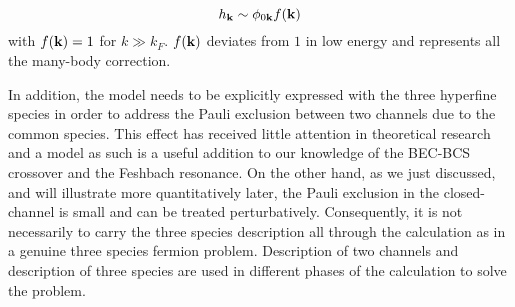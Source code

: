 \begin{equation}\label{eq:pathInt2:hphif}
h_{\mathbf{k}}\sim\phi_{0\mathbf{k}}f(\mathbf{k})
\end{equation}
 with $f(\mathbf{k})=1$ for $k\gg{k_{F}}$.  $f(\mathbf{k})$ deviates from $1$ in low energy and represents all the many-body correction. 

%
% 
%
In addition, the model needs to be explicitly expressed with the three hyperfine species in order to address the Pauli exclusion between two channels due to the common species.  This effect has received little  attention in theoretical research and a model as such is a useful addition to our knowledge of the BEC-BCS crossover and the Feshbach resonance.  On the other hand, as we just discussed, and will illustrate more quantitatively later, the Pauli exclusion in the closed-channel is small and can be treated perturbatively.  Consequently, it is not necessarily to carry the three species description all through the calculation as in a genuine three species fermion problem.  Description of two channels and description of three species are used in different phases of the calculation to solve the problem.  

